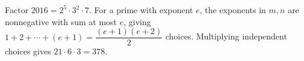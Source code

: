 Factor $2016=2^5\cdot3^2\cdot7$. For a prime with exponent $e$, the exponents in $m,n$ are nonnegative with sum at most $e$, giving $1+2+\cdots+(e+1)=\dfrac{(e+1)(e+2)}{2}$ choices. Multiplying independent choices gives $21\cdot6\cdot3=\boxed{378}$.

